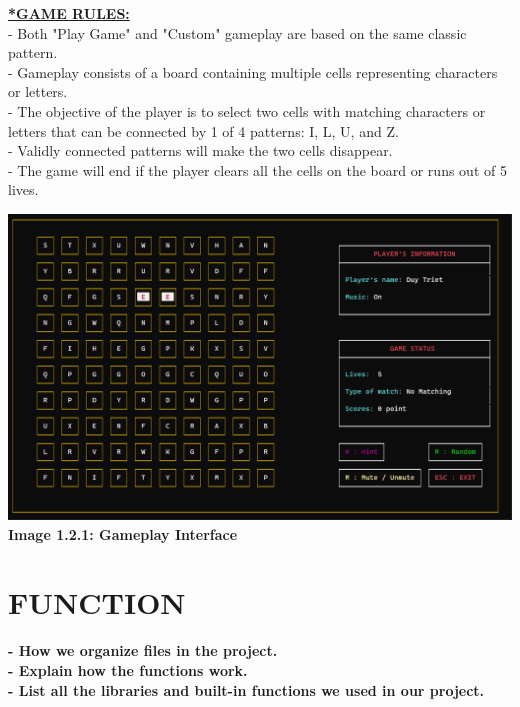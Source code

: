 \documentclass[12pt,a4paper]{report}
\begin{document}
\hspace{-0.6cm}\textbf{\underline{*GAME RULES:}}\\[0.2cm]
- Both "Play Game" and "Custom" gameplay are based on the same classic pattern.\\
- Gameplay consists of a board containing multiple cells representing characters or letters.\\
- The objective of the player is to select two cells with matching characters or letters that can be connected by 1 of 4 patterns: I, L, U, and Z.\\
- Validly connected patterns will make the two cells disappear.\\
- The game will end if the player clears all the cells on the board or runs out of 5 lives.\\
\begin{center}
    \includegraphics[scale=0.3]{Select.png}\\[0.2cm]
    \textbf{Image 1.2.1: Gameplay Interface}
\end{center}

\newpage
\chapter{FUNCTION}
\textbf{\large- How we organize files in the project.\\[0.2cm]
- Explain how the functions work.\\[0.2cm]
- List all the libraries and built-in functions we used in our project.}
\newpage
\end{document}
